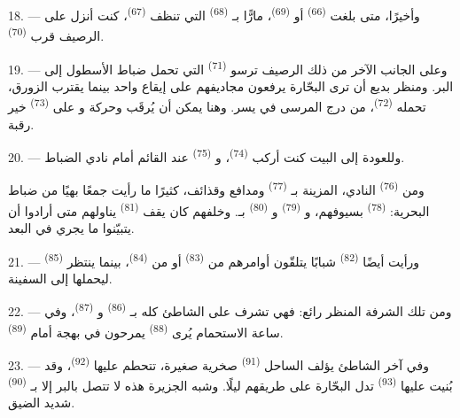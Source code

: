 18. --- وأخيرًا، متى بلغت  \textsuperscript{(66)} أو
 \textsuperscript{(69)}، مارًّا بـ
\textsuperscript{(68)} التي تنظف  \textsuperscript{(67)}، كنت أنزل
على الرصيف قرب  \textsuperscript{(70)}.

19. --- وعلى الجانب الآخر من ذلك الرصيف ترسو 
\textsuperscript{(71)} التي تحمل ضباط الأسطول إلى البر. ومنظر بديع أن ترى
البحّارة يرفعون مجاديفهم على إيقاع واحد بينما يقترب الزورق، تحمله
 \textsuperscript{(72)}، من درج المرسى في يسر. وهنا يمكن أن
يُرقَب  وحركة  و على
 \textsuperscript{(73)} خير رقبة.

\VUsaut{3.0mm}
\VUsaut{3.0mm}

20. --- وللعودة إلى البيت كنت أركب 
\textsuperscript{(74)}، و \textsuperscript{(75)} عند 
القائم أمام نادي الضباط.

ومن  \textsuperscript{(76)} النادي، المزينة بـ
\textsuperscript{(77)} ومدافع وقذائف، كثيرًا ما رأيت جمعًا بهيًا من ضباط
البحرية:  \textsuperscript{(78)} بسيوفهم، و
\textsuperscript{(79)} و \textsuperscript{(80)} بـ.
وخلفهم كان يقف  \textsuperscript{(81)} يناولهم 
متى أرادوا أن يتبيّنوا ما يجري في البعد.

21. --- ورأيت أيضًا  \textsuperscript{(82)} شبابًا يتلقّون
أوامرهم من  \textsuperscript{(83)} أو من 
\textsuperscript{(84)}، بينما ينتظر  \textsuperscript{(85)}
ليحملها إلى السفينة.

22. --- ومن تلك الشرفة المنظر رائع: فهي تشرف على الشاطئ كله
بـ \textsuperscript{(86)} و \textsuperscript{(87)}،
وفي ساعة الاستحمام يُرى  \textsuperscript{(88)} يمرحون في
بهجة أمام  \textsuperscript{(89)}.

23. --- وفي آخر الشاطئ يؤلف الساحل  \textsuperscript{(91)}
صخرية صغيرة، تتحطم عليها  \textsuperscript{(92)}،
وقد بُنيت عليها  \textsuperscript{(93)} تدل البحّارة على طريقهم
ليلًا. وشبه الجزيرة هذه لا تتصل بالبر إلا بـ \textsuperscript{(90)}
شديد الضيق.

